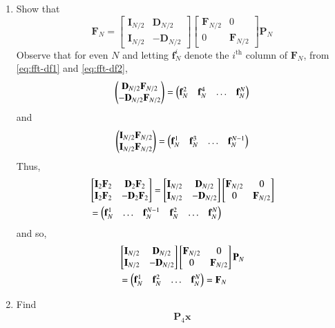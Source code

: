 \documentclass[journal,12pt,twocolumn]{IEEEtran}
\let\vec\mathbf
\renewcommand\thesection{\arabic{section}}
\begin{document}
\begin{enumerate}[label=\thesection.\arabic*]
\item Show that 
\begin{equation}
\vec{F}_{N}=
\begin{bmatrix}
\vec{I}_{N/2} & \vec{D}_{N/2} \\
\vec{I}_{N/2} & -\vec{D}_{N/2}
\end{bmatrix}
\begin{bmatrix}
\vec{F}_{N/2} & 0 \\
0 & \vec{F}_{N/2}
\end{bmatrix}
\vec{P}_{N}
\end{equation}
\solution Observe that for even $N$ and letting $\vec{f}_N^i$ denote the $i^{\text{th}}$ column of $\vec{F}_N$, from \eqref{eq:fft-df1} and \eqref{eq:fft-df2},
\begin{align}
	\myvec{\vec{D}_{N/2}\vec{F}_{N/2} \\ -\vec{D}_{N/2}\vec{F}_{N/2}} = \myvec{\vec{f}_N^{2} & \vec{f}_N^{4} & \ldots & \vec{f}_N^{N}}
\end{align}
and
\begin{align}
	\myvec{\vec{I}_{N/2}\vec{F}_{N/2} \\ \vec{I}_{N/2}\vec{F}_{N/2}} = \myvec{\vec{f}_N^{1} & \vec{f}_N^{3} & \ldots & \vec{f}_N^{N - 1}}
\end{align}
Thus,
\begin{align}
	&\mybvec{\vec{I}_2\vec{F}_2 & \vec{D}_2\vec{F}_2 \\ \vec{I}_2\vec{F}_2 & -\vec{D}_2\vec{F}_2} = \mybvec{\vec{I}_{N/2} & \vec{D}_{N/2} \\ \vec{I}_{N/2} & -\vec{D}_{N/2}}\mybvec{\vec{F}_{N/2} & 0 \\ 0 & \vec{F}_{N/2}} \nonumber \\
	&= \myvec{\vec{f}_N^{1} & \ldots & \vec{f}_N^{N - 1} & \vec{f}_N^{2} & \ldots & \vec{f}_N^{N}}
\end{align}
and so,
\begin{align}
	&\mybvec{\vec{I}_{N/2} & \vec{D}_{N/2} \\ \vec{I}_{N/2} & -\vec{D}_{N/2}}\mybvec{\vec{F}_{N/2} & 0 \\ 0 & \vec{F}_{N/2}}\vec{P}_{N} \nonumber \\
	&= \myvec{\vec{f}_N^{1} & \vec{f}_N^{2} & \ldots & \vec{f}_N^{N}} = \vec{F}_N
\end{align}
\item Find 
    \begin{align}
	     \vec{P}_4 \vec{x}

\end{align}
\end{enumerate}
\end{document}

